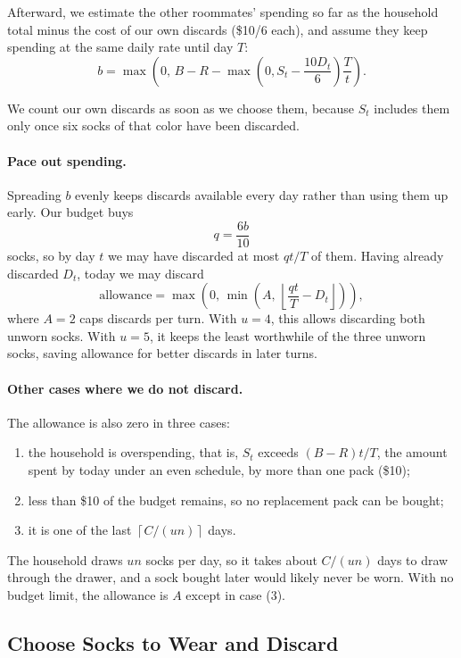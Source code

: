 \documentclass[11pt]{article}
\begin{document}
Afterward, we estimate the other roommates' spending so far as the household total minus the cost of our own discards (\$10/6 each), and assume they keep spending at the same daily rate until day \(T\):
\[
b
=
\max\left(
0,\,
B-R-
\max\left(0,S_t-\frac{10D_t}{6}\right)\frac{T}{t}
\right).
\]

We count our own discards as soon as we choose them, because \(S_t\) includes them only once six socks of that color have been discarded.

\paragraph{Pace out spending.}
Spreading \(b\) evenly keeps discards available every day rather than using them up early. Our budget buys
\[
q=\frac{6b}{10}
\]
socks, so by day \(t\) we may have discarded at most \(qt/T\) of them. Having already discarded \(D_t\), today we may discard
\[
\mathrm{allowance}
=
\max\left(
0,\,
\min\left(
A,\,
\left\lfloor
\frac{qt}{T}-D_t
\right\rfloor
\right)
\right),
\]
where \(A=2\) caps discards per turn. With \(u=4\), this allows discarding both unworn socks. With \(u=5\), it keeps the least worthwhile of the three unworn socks, saving allowance for better discards in later turns.

\paragraph{Other cases where we do not discard.}
The allowance is also zero in three cases:
\begin{enumerate}[label=(\arabic*)]
    \item the household is overspending, that is, \(S_t\) exceeds \((B-R)t/T\), the amount spent by today under an even schedule, by more than one pack (\$10);
    \item less than \$10 of the budget remains, so no replacement pack can be bought;
    \item it is one of the last \(\left\lceil C/(un)\right\rceil\) days.
\end{enumerate}

The household draws \(un\) socks per day, so it takes about \(C/(un)\) days to draw through the drawer, and a sock bought later would likely never be worn. With no budget limit, the allowance is \(A\) except in case (3).

\subsection{Choose Socks to Wear and Discard}
\end{document}
